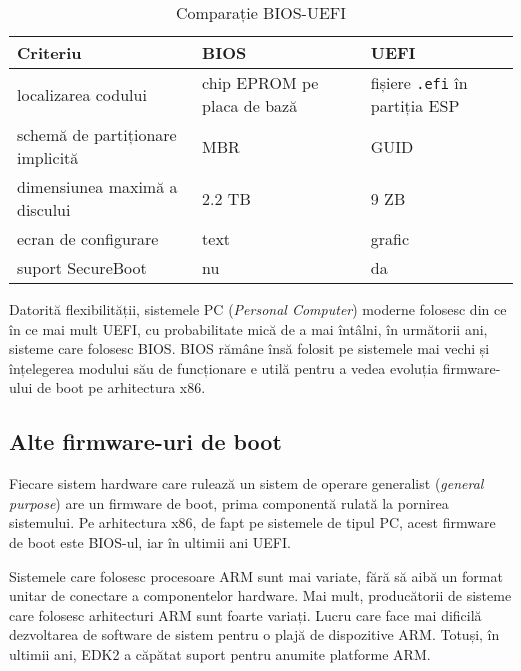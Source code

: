 \begin{table}[!htb]
  \begin{center}
    \begin{tabular}{ p{} p{} p{} }
      \toprule
        \textbf{Criteriu} &
        \textbf{BIOS} &
        \textbf{UEFI} \\
      \midrule
        localizarea codului &
        chip EPROM pe placa de bază &
        fișiere \texttt{.efi} în partiția ESP \\
      \midrule
        schemă de partiționare implicită &
        MBR &
        GUID \\
      \midrule
        dimensiunea maximă a discului &
        2.2 TB &
        9 ZB \\
      \midrule
        ecran de configurare &
        text &
        grafic \\
      \midrule
        suport SecureBoot &
        nu &
        da \\
      \bottomrule
    \end{tabular}
  \end{center}
  \caption{Comparație BIOS-UEFI}
  \label{tab:boot:bios-uefi}
\end{table}

Datorită flexibilității, sistemele PC  (\textit{Personal Computer}) moderne folosesc din ce în ce mai mult UEFI, cu probabilitate mică de a mai întâlni, în următorii ani, sisteme care folosesc BIOS.
BIOS rămâne însă folosit pe sistemele mai vechi și înțelegerea modului său de funcționare e utilă pentru a vedea evoluția firmware-ului de boot pe arhitectura x86.

\subsection{Alte firmware-uri de boot}
\label{sec:boot:other}

Fiecare sistem hardware care rulează un sistem de operare generalist (\textit{general purpose}) are un firmware de boot, prima componentă rulată la pornirea sistemului.
Pe arhitectura x86, de fapt pe sistemele de tipul PC, acest firmware de boot este BIOS-ul, iar în ultimii ani UEFI.

Sistemele care folosesc procesoare ARM sunt mai variate, fără să aibă un format unitar de conectare a componentelor hardware.
Mai mult, producătorii de sisteme care folosesc arhitecturi ARM sunt foarte variați.
Lucru care face mai dificilă dezvoltarea de software de sistem pentru o plajă de dispozitive ARM.
Totuși, în ultimii ani, EDK2 a căpătat suport pentru anumite platforme ARM.

